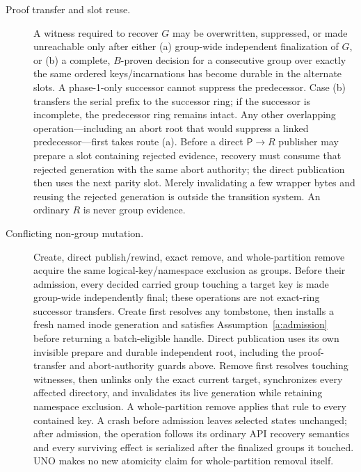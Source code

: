 \documentclass[10pt,twocolumn]{article}
\theoremstyle{remark}
\begin{document}
\begin{description}
  \item[Proof transfer and slot reuse.] A witness required to recover $G$ may be overwritten,
  suppressed, or made unreachable only after either (a) group-wide independent finalization of
  $G$, or (b) a complete, $B$-proven decision for a consecutive group over exactly the same ordered
  keys/incarnations has become durable in the alternate slots. A phase-1-only successor cannot
  suppress the predecessor. Case (b) transfers the serial prefix to the successor ring; if the
  successor is incomplete, the predecessor ring remains intact. Any
  other overlapping operation---including an abort root that would suppress a linked
  predecessor---first takes route (a). Before a direct $\mathsf{P}\to R$ publisher may prepare a
  slot containing rejected evidence, recovery must consume that rejected generation with the same
  abort authority; the direct publication then uses the next parity slot. Merely invalidating a few
  wrapper bytes and reusing the rejected generation is outside the transition system. An ordinary
  $R$ is never group evidence.

  \item[Conflicting non-group mutation.] Create, direct publish/rewind, exact remove, and
  whole-partition remove acquire the same logical-key/namespace exclusion as groups. Before their
  admission, every decided carried group touching a target key is made group-wide independently
  final; these operations are not exact-ring successor transfers. Create first resolves any
  tombstone, then installs a fresh named inode generation and satisfies
  Assumption~\ref{a:admission} before returning a batch-eligible handle. Direct publication uses its
  own invisible prepare and durable independent root, including the proof-transfer and abort-authority guards
  above. Remove first resolves touching witnesses, then unlinks only the exact current target,
  synchronizes every affected directory, and invalidates its live generation while retaining
  namespace exclusion. A whole-partition remove applies that rule to every contained key. A crash
  before admission leaves selected states unchanged; after admission, the operation follows its
  ordinary API recovery semantics and every surviving effect is serialized after the finalized
  groups it touched. UNO makes no new atomicity claim for whole-partition removal itself.


\end{description}
\end{document}
